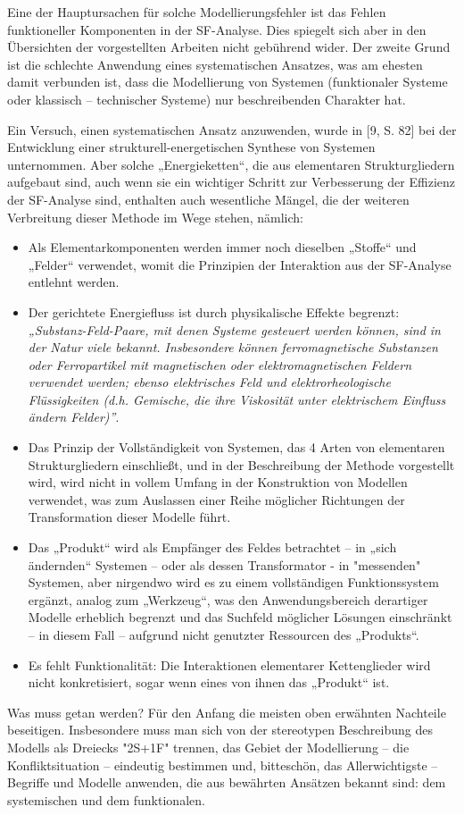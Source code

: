 \documentclass[11pt,a4paper]{article}
\begin{document}
Eine der Hauptursachen für solche Modellierungsfehler ist das Fehlen
funktioneller Komponenten in der SF-Analyse. Dies spiegelt sich aber in den
Übersichten der vorgestellten Arbeiten nicht gebührend wider. Der zweite Grund
ist die schlechte Anwendung eines systematischen Ansatzes, was am ehesten
damit verbunden ist, dass die Modellierung von Systemen (funktionaler Systeme
oder klassisch -- technischer Systeme) nur beschreibenden Charakter hat.

Ein Versuch, einen systematischen Ansatz anzuwenden, wurde in [9, S. 82] bei
der Entwicklung einer strukturell-energetischen Synthese von Systemen
unternommen. Aber solche „Energieketten“, die aus elementaren Strukturgliedern
aufgebaut sind, auch wenn sie ein wichtiger Schritt zur Verbesserung der
Effizienz der SF-Analyse sind, enthalten auch wesentliche Mängel, die der
weiteren Verbreitung dieser Methode im Wege stehen, nämlich:
\begin{itemize}
\item Als Elementarkomponenten werden immer noch dieselben „Stoffe“ und
  „Felder“ verwendet, womit die Prinzipien der Interaktion aus der SF-Analyse
  entlehnt werden.
\item Der gerichtete Energiefluss ist durch physikalische Effekte begrenzt:
  \emph{„Substanz-Feld-Paare, mit denen Systeme gesteuert werden können, sind
    in der Natur viele bekannt. Insbesondere können ferromagnetische
    Substanzen oder Ferropartikel mit magnetischen oder elektromagnetischen
    Feldern verwendet werden; ebenso elektrisches Feld und elektrorheologische
    Flüssigkeiten (d.h.  Gemische, die ihre Viskosität unter elektrischem
    Einfluss ändern Felder)”}.
\item Das Prinzip der Vollständigkeit von Systemen, das 4 Arten von
  elementaren Strukturgliedern einschließt, und in der Beschreibung der
  Methode vorgestellt wird, wird nicht in vollem Umfang in der Konstruktion
  von Modellen verwendet, was zum Auslassen einer Reihe möglicher Richtungen
  der Transformation dieser Modelle führt.
\item Das „Produkt“ wird als Empfänger des Feldes betrachtet -- in „sich
  ändernden“ Systemen -- oder als dessen Transformator - in "messenden"
  Systemen, aber nirgendwo wird es zu einem vollständigen Funktionssystem
  ergänzt, analog zum „Werkzeug“, was den Anwendungsbereich derartiger Modelle
  erheblich begrenzt und das Suchfeld möglicher Lösungen einschränkt -- in
  diesem Fall -- aufgrund nicht genutzter Ressourcen des „Produkts“.
\item Es fehlt Funktionalität: Die Interaktionen elementarer Kettenglieder
  wird nicht konkretisiert, sogar wenn eines von ihnen das „Produkt“ ist.
\end{itemize}
Was muss getan werden? Für den Anfang die meisten oben erwähnten Nachteile
beseitigen. Insbesondere muss man sich von der stereotypen Beschreibung des
Modells als Dreiecks "2S+1F" trennen, das Gebiet der Modellierung -- die
Konfliktsituation -- eindeutig bestimmen und, bitteschön, das Allerwichtigste
-- Begriffe und Modelle anwenden, die aus bewährten Ansätzen bekannt sind: dem
systemischen und dem funktionalen.
\end{document}
